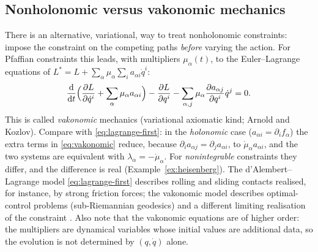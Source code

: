 \documentclass[11pt,a4paper]{article}
\theoremstyle{definition}
\theoremstyle{plain}
\theoremstyle{remark}
\newcommand{\ddt}{\frac{\mathrm{d}}{\mathrm{d}t}}
\newcommand{\pd}[2]{\frac{\partial #1}{\partial #2}}
\begin{document}
\subsection{Nonholonomic versus vakonomic mechanics}\label{sec:vako}
There is an alternative, variational, way to treat nonholonomic constraints: impose the
constraint on the competing paths \emph{before} varying the action. For Pfaffian constraints
this leads, with multipliers $\mu_\alpha(t)$, to the Euler--Lagrange equations of
$L^*=L+\sum_\alpha\mu_\alpha\sum_ia_{\alpha i}\dot q^i$:
\begin{equation}\label{eq:vakonomic}
  \ddt\Bigl(\pd L{\dot q^i}+\sum_\alpha\mu_\alpha a_{\alpha i}\Bigr)-\pd L{q^i}-\sum_{\alpha,j}\mu_\alpha\pd{a_{\alpha j}}{q^i}\dot q^j=0 .
\end{equation}
This is called \emph{vakonomic} mechanics (variational axiomatic kind; Arnold and Kozlov). Compare with
\eqref{eq:lagrange-first}: in the \emph{holonomic} case ($a_{\alpha i}=\partial_if_\alpha$) the
extra terms in \eqref{eq:vakonomic} reduce, because $\partial_ia_{\alpha j}=\partial_ja_{\alpha i}$, to $\dot\mu_\alpha a_{\alpha i}$, and the two systems are
equivalent with $\lambda_\alpha=-\dot\mu_\alpha$. For \emph{nonintegrable} constraints they differ,
and the difference is real (Example~\ref{ex:heisenberg}). The d'Alembert--Lagrange model
\eqref{eq:lagrange-first} describes rolling and sliding contacts realised, for instance, by
strong friction forces; the vakonomic model describes optimal-control problems (sub-Riemannian
geodesics) and a different limiting realisation of the constraint \cite{Kozlov1983,AKN2006}.
Also note that the vakonomic equations are of higher order: the multipliers are dynamical variables whose
initial values are additional data, so the evolution is not determined by $(q,\dot q)$ alone.
\end{document}
